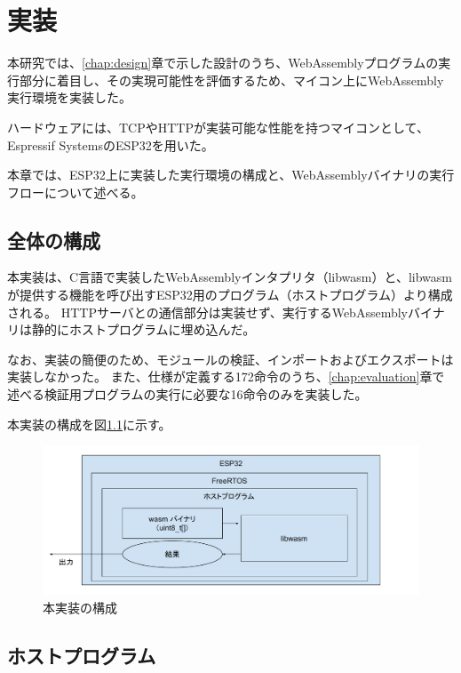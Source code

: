 \chapter{実装}
\label{chap:implementation}

本研究では、\ref{chap:design}章で示した設計のうち、WebAssemblyプログラムの実行部分に着目し、その実現可能性を評価するため、マイコン上にWebAssembly実行環境を実装した。

ハードウェアには、TCPやHTTPが実装可能な性能を持つマイコンとして、Espressif SystemsのESP32\cite{esp32}を用いた。

本章では、ESP32上に実装した実行環境の構成と、WebAssemblyバイナリの実行フローについて述べる。

\section{全体の構成}

本実装は、C言語で実装したWebAssemblyインタプリタ（libwasm）と、libwasmが提供する機能を呼び出すESP32用のプログラム（ホストプログラム）より構成される。
HTTPサーバとの通信部分は実装せず、実行するWebAssemblyバイナリは静的にホストプログラムに埋め込んだ。

なお、実装の簡便のため、モジュールの検証、インポートおよびエクスポートは実装しなかった。
また、仕様が定義する172命令のうち、\ref{chap:evaluation}章で述べる検証用プログラムの実行に必要な16命令のみを実装した。

本実装の構成を図\ref{fig:esp32_libwasm}に示す。

\begin{figure}[htbp]
  \caption{本実装の構成}
  \label{fig:esp32_libwasm}
  \begin{center}
    \includegraphics[bb=0 0 720 285,width=15cm]{img/esp32_libwasm.pdf}
  \end{center}
\end{figure}

\section{ホストプログラム}

